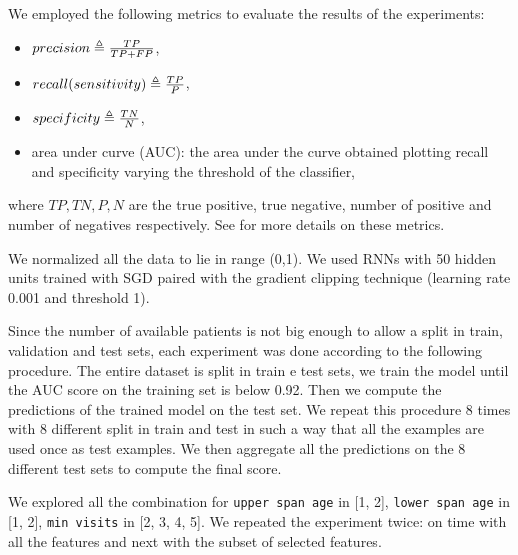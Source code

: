 We employed the following metrics to evaluate the results of the experiments:
\begin{itemize}
	\item $precision \triangleq \frac{TP}{TP+FP}$,
	\item $recall(sensitivity) \triangleq \frac{TP}{P}$,
	\item $specificity \triangleq 	\frac{TN}{N}$,
	\item area under curve (AUC): the area under the curve obtained plotting recall and specificity varying the threshold of the classifier,
\end{itemize}
where $TP, TN, P, N$ are the true positive, true negative, number of positive and number of negatives respectively. See \cite{RocMetrics} for more details on these metrics.

We normalized all the data to lie in range (0,1). 
We used RNNs with 50 hidden units trained with SGD paired with the gradient clipping technique (learning rate 0.001 and threshold 1).

Since the number of available patients is not big enough to allow a split in train, validation and test sets, each experiment was done according to the following procedure. The entire dataset is split in train e test sets, we train the model until the
AUC score on the training set is below 0.92. Then we compute the predictions of the trained model on the test set. We repeat this procedure 8 times with 8 different split in train and test in such a way that all the examples are used once as test examples. We then aggregate all the predictions on the 8 different test sets to compute the final score.
 
We explored all the combination for \texttt{upper span age} in [1, 2], \texttt{lower span age} in [1, 2], \texttt{min visits} in [2, 3, 4, 5].  We repeated the experiment twice: on time with all the features and next with the subset of selected features.



